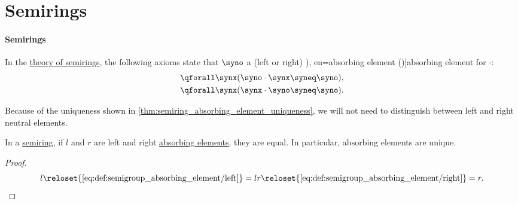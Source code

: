 \section{Semirings}\label{sec:semirings}

\paragraph{Semirings}

\begin{definition}\label{def:semigroup_absorbing_element}\mimprovised
  In the \hyperref[def:semiring/theory]{theory of semirings}, the following axioms state that \( \syno \) a (left or right) \term[ru=аннулирующее свойство (\cite[176]{БелоусовТкачёв2004ДискретнаяМатематика}), en=absorbing element (\cite[example 1.6]{Golan1999Semirings})]{absorbing element} for \( {\cdot} \):
  \begin{align}
    \qforall \synx (\syno \cdot \synx \syneq \syno), \label{eq:def:semigroup_absorbing_element/left} \\
    \qforall \synx (\synx \cdot \syno \syneq \syno). \label{eq:def:semigroup_absorbing_element/right}
  \end{align}

  Because of the uniqueness shown in \cref{thm:semiring_absorbing_element_uniqueness}, we will not need to distinguish between left and right neutral elements.
\end{definition}

\begin{proposition}\label{thm:semiring_absorbing_element_uniqueness}
  In a \hyperref[def:semiring]{semiring}, if \( l \) and \( r \) are left and right \hyperref[def:semigroup_absorbing_element]{absorbing elements}, they are equal. In particular, absorbing elements are unique.
\end{proposition}
\begin{proof}
  \begin{equation*}
    l
    \reloset {\eqref{eq:def:semigroup_absorbing_element/left}} =
    lr
    \reloset {\eqref{eq:def:semigroup_absorbing_element/right}} =
    r.
  \end{equation*}
\end{proof}

